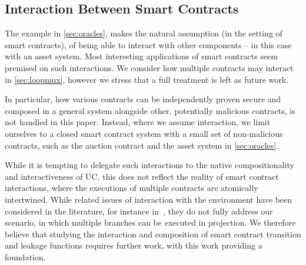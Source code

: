 \subsection{Interaction Between Smart Contracts}

The example in \autoref{sec:oracles}, makes the natural assumption (in the
setting of smart contracts), of being able to interact with other components
-- in this case with an asset system. Most interesting applications of smart
contracts seem premised on such interactions. We consider how multiple
contracts may interact in
\iffull\autoref{sec:loopmux}\else\cite[Appendix~J.3]{fullversion}\fi, however
we stress that a full treatment is left as future work.

In particular, how various contracts can be independently proven secure and
composed in a general system alongside other, potentially malicious contracts,
is not handled in this paper. Instead, where we assume interaction, we limit
ourselves to a closed smart contract system with a small set of non-malicious
contracts, such as the auction contract and the asset system in
\autoref{sec:oracles}.

While it is tempting to delegate such interactions to the native
compositionality and interactiveness of UC, this does not reflect the reality of
smart contract interactions, where the executions of multiple contracts are
atomically intertwined. While related issues of interaction with the
environment have been considered in the literature, for instance in~\cite{AC:CEKKR16,muc},
they do not fully address our scenario, in which multiple branches can be
executed in projection. We therefore believe that studying the interaction and
composition of smart contract transition and leakage functions requires further
work, with this work providing a foundation.

